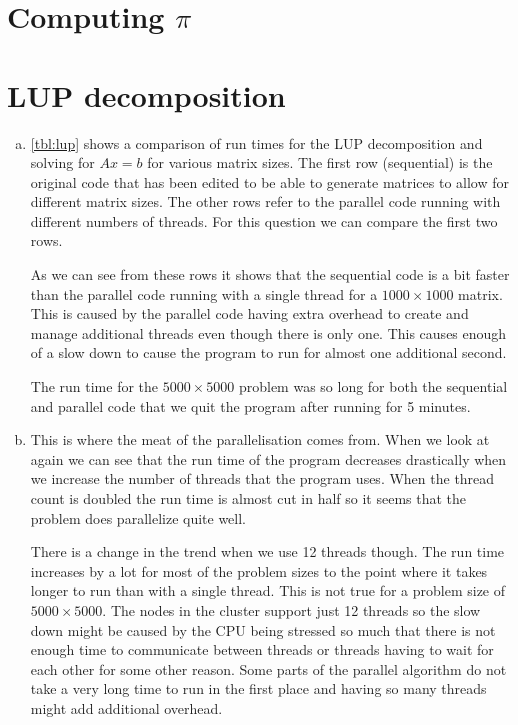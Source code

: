 \documentclass[a4paper]{article}
\begin{document}
\section{Computing $\pi$}

\section{LUP decomposition}
\begin{enumerate}[(a)]
	\item \autoref{tbl:lup} shows a comparison of run times for the LUP decomposition and solving for $Ax=b$ for various matrix sizes. The first row (sequential) is the original code that has been edited to be able to generate matrices to allow for different matrix sizes. The other rows refer to the parallel code running with different numbers of threads. For this question we can compare the first two rows.
	
	As we can see from these rows it shows that the sequential code is a bit faster than the parallel code running with a single thread for a $1000 \times 1000$ matrix. This is caused by the parallel code having extra overhead to create and manage additional threads even though there is only one. This causes enough of a slow down to cause the program to run for almost one additional second.
	
	The run time for the $5000 \times 5000$ problem was so long for both the sequential and parallel code that we quit the program after running for 5 minutes.
	
	\item This is where the meat of the parallelisation comes from. When we look at  again we can see that the run time of the program decreases drastically when we increase the number of threads that the program uses. When the thread count is doubled the run time is almost cut in half so it seems that the problem does parallelize quite well.
	
	There is a change in the trend when we use 12 threads though. The run time increases by a lot for most of the problem sizes to the point where it takes longer to run than with a single thread. This is not true for a problem size of $5000 \times 5000$. The nodes in the cluster support just 12 threads so the slow down might be caused by the CPU being stressed so much that there is not enough time to communicate between threads or threads having to wait for each other for some other reason. Some parts of the parallel algorithm do not take a very long time to run in the first place and having so many threads might add additional overhead.


\end{enumerate}
\end{document}
